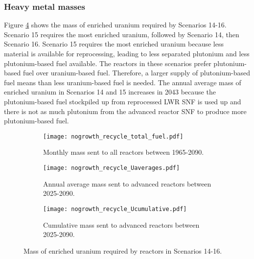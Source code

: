 \subsubsection{Heavy metal masses}
Figure \ref{fig:nogrowth_recycle_uranium} shows 
the mass of enriched uranium required by Scenarios 14-16. 
Scenario 15 requires the most enriched uranium, followed by 
Scenario 14, then Scenario 16. Scenario 15 requires the most enriched 
uranium because less material is available for reprocessing, leading to 
less separated plutonium and less plutonium-based fuel available. The reactors 
in these scenarios prefer plutonium-based fuel over uranium-based fuel. 
Therefore, a larger supply of plutonium-based fuel means than less 
uranium-based fuel is needed.
The annual average mass of enriched uranium in Scenarios 14 and 15 increases 
in 2043 because the plutonium-based fuel stockpiled up from 
reprocessed \gls{LWR} \gls{SNF} is used up and there is not as much 
plutonium from the advanced reactor \gls{SNF} to produce more 
plutonium-based fuel. 

\begin{figure}[h!]
    \centering
    \begin{subfigure}[b]{0.45\textwidth}
        \centering
        \texttt{[image: nogrowth\_recycle\_total\_fuel.pdf]}
        \caption{Monthly mass sent to all reactors 
        between 1965-2090.}
        \label{fig:nogrowth_recycle_all_uranium}
    \end{subfigure}
    \hfill
    \begin{subfigure}[b]{0.45\textwidth}
        \centering
        \texttt{[image: nogrowth\_recycle\_Uaverages.pdf]}
        \caption{Annual average mass sent to 
        advanced reactors between 2025-2090.}
        \label{fig:nogrowth_recycle_AR_uranium}
    \end{subfigure}
    \begin{subfigure}[b]{0.45\textwidth}
        \centering
        \texttt{[image: nogrowth\_recycle\_Ucumulative.pdf]}
        \caption{Cumulative mass sent to advanced reactors between 2025-2090.}
        \label{fig:nogrowth_recycle_uranium_cumulative}
    \end{subfigure}
       \caption{Mass of enriched uranium required by reactors
        in Scenarios 14-16.}
       \label{fig:nogrowth_recycle_uranium}
\end{figure}

